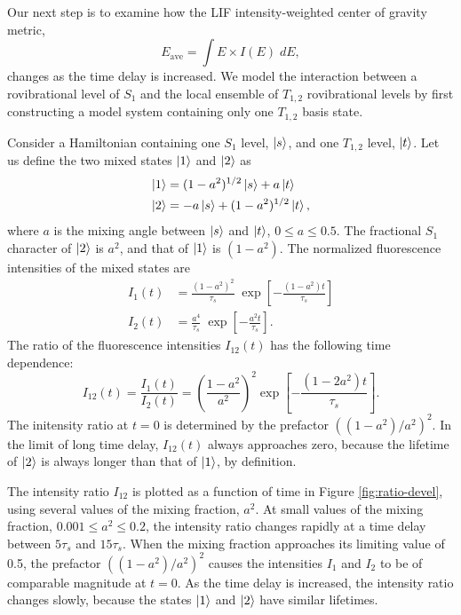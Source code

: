 \documentclass[12pt]{mitthesis}
\begin{document}
Our next step is to examine how the LIF intensity-weighted center of
gravity metric,
\begin{equation}
  E_{\text{ave}} = \int E \times I(E) \; dE,
\end{equation}
changes as the time delay is increased.  We model the interaction
between a rovibrational level of $S_1$ and the local ensemble of
$T_{1,2}$ rovibrational levels by first constructing a model system
containing only one $T_{1,2}$ basis state.


Consider a Hamiltonian containing one $S_1$ level, $\mathinner{|{s}\rangle}$, and one
$T_{1,2}$ level, $\mathinner{|{t}\rangle}$.  Let us define the two mixed states
$\mathinner{|{1}\rangle}$ and $\mathinner{|{2}\rangle}$ as
\begin{equation}
  \begin{split}
    \mathinner{|{1}\rangle} &=  (1 - a^2)^{1/2} \mathinner{|{s}\rangle} + a \mathinner{|{t}\rangle}\\
    \mathinner{|{2}\rangle} &= -a \mathinner{|{s}\rangle} + (1 - a^2)^{1/2} \mathinner{|{t}\rangle},
  \end{split}
\end{equation}
where $a$ is the mixing angle between $\mathinner{|{s}\rangle}$ and $\mathinner{|{t}\rangle}$, $0 \leq
a \leq 0.5$.  The fractional $S_1$ character of $\mathinner{|{2}\rangle}$ is $a^2$,
and that of $\mathinner{|{1}\rangle}$ is $(1 - a^2)$.  The normalized fluorescence
intensities of the mixed states are
\begin{equation}
  \begin{split}
    I_1(t) &= \frac{(1 - a^2)^2}{\tau_s} \; \exp 
          \left[
            - \frac{(1 - a^2) t}{\tau_s}
          \right]\\
    I_2(t) &= \frac{a^4}{\tau_s} \; \exp 
          \left[
            - \frac{a^2 t}{\tau_s}
          \right].
  \end{split}
\end{equation}
The ratio of the fluorescence intensities $I_{12}(t)$ has the
following time dependence:
\begin{equation}
  I_{12}(t) = \frac{I_1(t)}{I_2(t)} = 
  \left(
    \frac{1 - a^2}{a^2}
  \right)^2
  \exp
  \left[
    - \frac{(1 - 2a^2) t}{\tau_s}
  \right].
\end{equation}  
The initensity ratio at $t=0$ is determined by the prefactor $( (1 -
a^2)/a^2 )^2$.  In the limit of long time delay, $I_{12}(t)$
always approaches zero, because the lifetime of $\mathinner{|{2}\rangle}$ is always
longer than that of $\mathinner{|{1}\rangle}$, by definition.  

The intensity ratio $I_{12}$ is plotted as a function of time in
Figure \ref{fig:ratio-devel}, using several values of the mixing
fraction, $a^2$.  At small values of the mixing fraction, $0.001
\leq a^2 \leq 0.2$, the intensity ratio changes rapidly at a time
delay between $5\tau_s$ and $15\tau_s$.  When the mixing fraction
approaches its limiting value of 0.5, the prefactor $( (1 -
a^2)/a^2 )^2$ causes the intensities $I_1$ and $I_2$ to be
of comparable magnitude at $t=0$.  As the time delay is increased, the
intensity ratio changes slowly, because the states $\mathinner{|{1}\rangle}$ and
$\mathinner{|{2}\rangle}$ have similar lifetimes.
\end{document}

